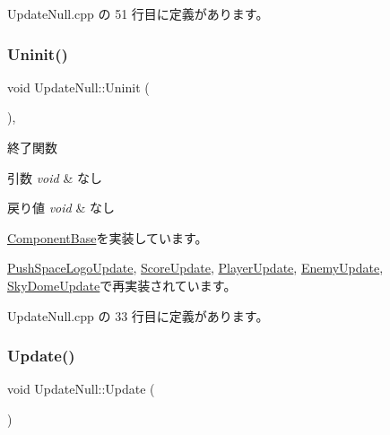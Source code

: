  Update\+Null.\+cpp の 51 行目に定義があります。

\mbox{\label{class_update_null_a820189d686ec62f7a30d547118c419df}} 
\subsubsection{\texorpdfstring{Uninit()}{Uninit()}}
{\footnotesize\ttfamily void Update\+Null\+::\+Uninit (\begin{DoxyParamCaption}{ }\end{DoxyParamCaption})\hspace{0.3cm}{\ttfamily [override]}, {\ttfamily [virtual]}}



終了関数 


\begin{DoxyParams}{引数}
{\em void} & なし \\
\hline
\end{DoxyParams}

\begin{DoxyRetVals}{戻り値}
{\em void} & なし \\
\hline
\end{DoxyRetVals}


\mbox{\hyperlink{class_component_base_a9f42beaf0383d6f629819579cab4de57}{Component\+Base}}を実装しています。



\mbox{\hyperlink{class_push_space_logo_update_a94f791874cb6160cd33cd7068fcde0d0}{Push\+Space\+Logo\+Update}}, \mbox{\hyperlink{class_score_update_a701d9c84c3ef92b1c54f33b37e23605f}{Score\+Update}}, \mbox{\hyperlink{class_player_update_a997e0813a825d7525da4b5b89a290168}{Player\+Update}}, \mbox{\hyperlink{class_enemy_update_a294a5d4c65551af43e933cb65036f279}{Enemy\+Update}}, \mbox{\hyperlink{class_sky_dome_update_a54da74ef017a22075ce473abe1345489}{Sky\+Dome\+Update}}で再実装されています。



 Update\+Null.\+cpp の 33 行目に定義があります。

\mbox{\label{class_update_null_ab3f9cabc6ddcb4ef8743f212c26be144}} 
\subsubsection{\texorpdfstring{Update()}{Update()}}
{\footnotesize\ttfamily void Update\+Null\+::\+Update (\begin{DoxyParamCaption}{ }\end{DoxyParamCaption})\hspace{0.3cm}{\ttfamily [virtual]}}



